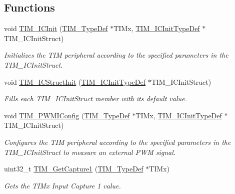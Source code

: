 \subsection*{Functions}
\begin{DoxyCompactItemize}
\item 
void \hyperlink{group___t_i_m___group3_ga9e6a153dd6552e4e1188eba227316f7f}{T\+I\+M\+\_\+\+I\+C\+Init} (\hyperlink{struct_t_i_m___type_def}{T\+I\+M\+\_\+\+Type\+Def} $\ast$T\+I\+Mx, \hyperlink{struct_t_i_m___i_c_init_type_def}{T\+I\+M\+\_\+\+I\+C\+Init\+Type\+Def} $\ast$T\+I\+M\+\_\+\+I\+C\+Init\+Struct)
\begin{DoxyCompactList}\small\item\em Initializes the T\+IM peripheral according to the specified parameters in the T\+I\+M\+\_\+\+I\+C\+Init\+Struct. \end{DoxyCompactList}\item 
void \hyperlink{group___t_i_m___group3_ga5005dac8e4e8a4c7fc2a0ef05b77cc50}{T\+I\+M\+\_\+\+I\+C\+Struct\+Init} (\hyperlink{struct_t_i_m___i_c_init_type_def}{T\+I\+M\+\_\+\+I\+C\+Init\+Type\+Def} $\ast$T\+I\+M\+\_\+\+I\+C\+Init\+Struct)
\begin{DoxyCompactList}\small\item\em Fills each T\+I\+M\+\_\+\+I\+C\+Init\+Struct member with its default value. \end{DoxyCompactList}\item 
void \hyperlink{group___t_i_m___group3_gaa71f9296556310f85628d6c748a06475}{T\+I\+M\+\_\+\+P\+W\+M\+I\+Config} (\hyperlink{struct_t_i_m___type_def}{T\+I\+M\+\_\+\+Type\+Def} $\ast$T\+I\+Mx, \hyperlink{struct_t_i_m___i_c_init_type_def}{T\+I\+M\+\_\+\+I\+C\+Init\+Type\+Def} $\ast$T\+I\+M\+\_\+\+I\+C\+Init\+Struct)
\begin{DoxyCompactList}\small\item\em Configures the T\+IM peripheral according to the specified parameters in the T\+I\+M\+\_\+\+I\+C\+Init\+Struct to measure an external P\+WM signal. \end{DoxyCompactList}\item 
uint32\+\_\+t \hyperlink{group___t_i_m___group3_ga6bd39ca543305ff0cd06fce0f678d94d}{T\+I\+M\+\_\+\+Get\+Capture1} (\hyperlink{struct_t_i_m___type_def}{T\+I\+M\+\_\+\+Type\+Def} $\ast$T\+I\+Mx)
\begin{DoxyCompactList}\small\item\em Gets the T\+I\+Mx Input Capture 1 value. \end{DoxyCompactList}\item 

\end{DoxyCompactItemize}
